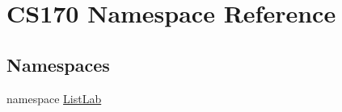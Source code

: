 \hypertarget{namespace_c_s170}{\section{C\-S170 Namespace Reference}
\label{namespace_c_s170}
}
\subsection*{Namespaces}
\begin{DoxyCompactItemize}
\item 
namespace \hyperlink{namespace_c_s170_1_1_list_lab}{List\-Lab}
\end{DoxyCompactItemize}

